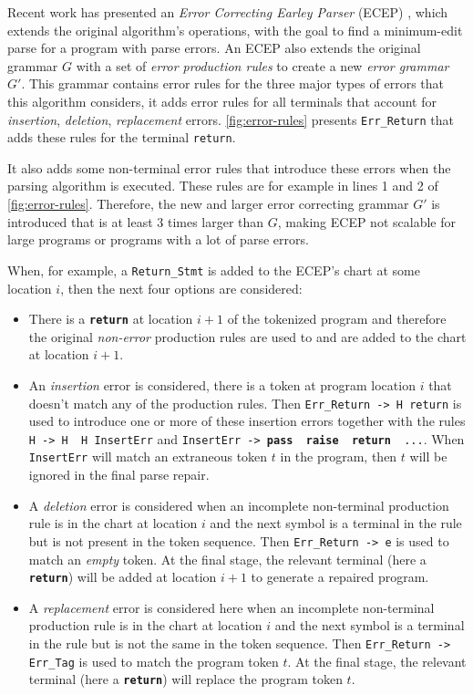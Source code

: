  Recent work has presented an \emph{Error
Correcting Earley Parser} (ECEP) \citep{Aho_1972}, which extends the original
algorithm's operations, with the goal to find a minimum-edit parse for a program
with parse errors. An ECEP also extends the original grammar $G$ with a set of
\emph{error production rules} to create a new \emph{error grammar} $G'$. This
grammar contains error rules for the three major types of errors that this
algorithm considers, \ie it adds error rules for all terminals that account for
\emph{insertion}, \emph{deletion}, \emph{replacement} errors.
\autoref{fig:error-rules} presents \texttt{Err\_Return} that adds these rules
for the terminal \texttt{return}.

It also adds some non-terminal error rules that introduce these errors when the
parsing algorithm is executed. These rules are for example in lines 1 and 2 of
\autoref{fig:error-rules}. Therefore, the new and larger error correcting
grammar $G'$ is introduced that is at least 3 times larger than $G$, making ECEP
not scalable for large programs or programs with a lot of parse errors.

When, for example, a \texttt{Return\_Stmt} is added to the ECEP's chart at some
location $i$, then the next four options are considered:
\begin{itemize}
  \item There is a \texttt{\bfseries return} at location $i+1$ of the tokenized
  program and therefore the original \emph{non-error} production rules are used
  to and are added to the chart at location $i+1$.
  \item An \emph{insertion} error is considered, \ie there is a token at program
  location $i$ that doesn't match any of the production rules. Then
  \texttt{Err\_Return -> H return} is used to introduce one or more of these
  insertion errors together with the rules \texttt{H -> H \textbar\ H InsertErr}
  and \texttt{InsertErr -> \textbf{pass} \textbar\ \textbf{raise} \textbar\
  \textbf{return} \textbar\ ...}. When \texttt{InsertErr} will match an
  extraneous token $t$ in the program, then $t$ will be ignored in the final
  parse repair.
  \item A \emph{deletion} error is considered when an incomplete non-terminal
  production rule is in the chart at location $i$ and the next symbol is a
  terminal in the rule but is not present in the token sequence. Then
  \texttt{Err\_Return -> e} is used to match an \emph{empty} token. At the final
  stage, the relevant terminal (here a \texttt{\textbf{return}}) will be added
  at location $i+1$ to generate a repaired program.
  \item A \emph{replacement} error is considered here when an incomplete
  non-terminal production rule is in the chart at location $i$ and the next
  symbol is a terminal in the rule but is not the same in the token sequence.
  Then \texttt{Err\_Return -> Err\_Tag} is used to match the program token $t$.
  At the final stage, the relevant terminal (here a \texttt{\textbf{return}})
  will replace the program token $t$.
\end{itemize}


